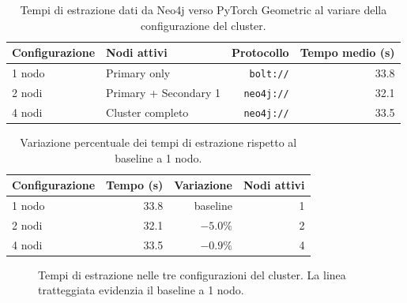 \begin{table}[ht!]
\centering
\small
\begin{tabular}{llrr}
\toprule
\textbf{Configurazione} & \textbf{Nodi attivi} & \textbf{Protocollo} & \textbf{Tempo medio (s)} \\
\midrule
1 nodo  & Primary only           & \texttt{bolt://}   & 33.8 \\
2 nodi  & Primary + Secondary 1  & \texttt{neo4j://}  & 32.1 \\
4 nodi  & Cluster completo       & \texttt{neo4j://}  & 33.5 \\
\bottomrule
\end{tabular}
\caption{Tempi di estrazione dati da Neo4j verso PyTorch Geometric al variare della configurazione del cluster.}
\label{tab:benchmark_infra}
\end{table}

\begin{table}[ht!]
\centering
\small
\begin{tabular}{lrrr}
\toprule
\textbf{Configurazione} & \textbf{Tempo (s)} & \textbf{Variazione} & \textbf{Nodi attivi} \\
\midrule
1 nodo  & 33.8 & baseline  & 1 \\
2 nodi  & 32.1 & $-5.0\%$  & 2 \\
4 nodi  & 33.5 & $-0.9\%$  & 4 \\
\bottomrule
\end{tabular}
\caption{Variazione percentuale dei tempi di estrazione rispetto al baseline a 1 nodo.}
\label{tab:benchmark_delta}
\end{table}

\begin{figure}[ht!]
\centering
{}
\caption{Tempi di estrazione nelle tre configurazioni del cluster. La linea tratteggiata evidenzia il baseline a 1 nodo.}
\label{fig:benchmark_bar}
\end{figure}

